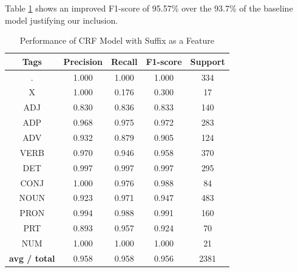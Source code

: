 \documentclass[12pt]{article}
\begin{document}
Table \ref{tab:table5} shows an improved F1-score of 95.57\% over the 93.7\% of the baseline model justifying our inclusion.


\begin{table}[h!]
\begin{center}
    \caption{Performance of CRF Model with Suffix as a Feature}
    \label{tab:table5}
\begin{tabular}{ c c c c c}
 \textbf{Tags}& \textbf{Precision} & \textbf{Recall} & \textbf{F1-score} & \textbf{Support} \\ 
 \hline


          .  &    1.000 &    1.000 &    1.000    &   334\\ 
          X   &   1.000  &   0.176 &    0.300    &    17\\ 
        ADJ   &   0.830  &   0.836 &    0.833    &   140\\ 
        ADP  &    0.968  &   0.975 &    0.972    &   283\\ 
        ADV  &    0.932  &   0.879 &    0.905    &   124\\ 
       VERB  &    0.970  &   0.946 &    0.958    &   370\\
        DET  &    0.997  &   0.997 &    0.997    &   295\\ 
       CONJ  &    1.000  &   0.976 &    0.988    &    84\\ 
       NOUN  &    0.923  &   0.971 &    0.947    &   483\\ 
       PRON  &    0.994  &   0.988 &    0.991    &   160\\ 
        PRT  &    0.893  &   0.957 &    0.924    &    70\\ 
        NUM  &    1.000  &   1.000 &    1.000    &    21\\ 
\hline
\textbf{avg / total} &   0.958  &   0.958  &   0.956   &   2381

\end{tabular}
\end{center}
\end{table}
\end{document}
